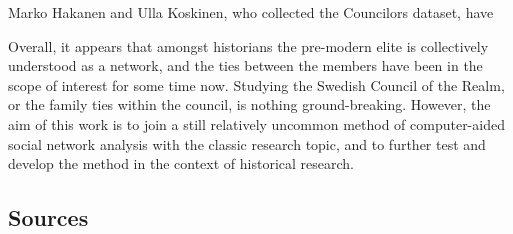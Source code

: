 \documentclass[a4paper,12pt]{article}
\begin{document}
 Marko Hakanen and Ulla Koskinen, who collected the Councilors dataset, have 
 
 Overall, it appears that amongst historians the pre-modern elite is collectively understood as a network, and the ties between the members have been in the scope of interest for some time now. Studying the Swedish Council of the Realm, or the family ties within the council, is nothing ground-breaking. However, the aim of this work is to join a still relatively uncommon method of computer-aided social network analysis with the classic research topic, and to further test and develop the method in the context of historical research. 

\subsection{Sources}
\end{document}
